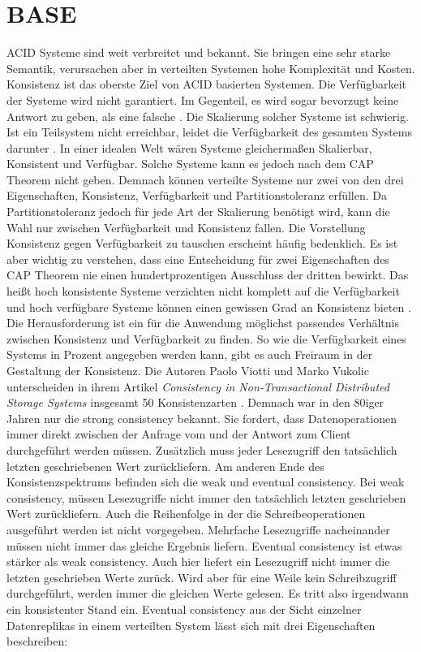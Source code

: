 \documentclass[12pt,oneside,a4paper,parskip]{scrbook}
\begin{document}
\section{BASE}
ACID Systeme sind weit verbreitet und bekannt. Sie bringen eine sehr starke Semantik, verursachen aber in verteilten Systemen hohe Komplexität und Kosten. Konsistenz ist das oberste Ziel von ACID basierten Systemen. Die Verfügbarkeit der Systeme wird nicht garantiert. Im Gegenteil, es wird sogar bevorzugt keine Antwort zu geben, als eine falsche \cite{clusterBASE}. Die Skalierung solcher Systeme ist schwierig. Ist ein Teilsystem nicht erreichbar, leidet die Verfügbarkeit des gesamten Systems darunter \cite{BASE}. In einer idealen Welt wären Systeme gleichermaßen Skalierbar, Konsistent und Verfügbar. Solche Systeme kann es jedoch nach dem CAP Theorem nicht geben. Demnach können verteilte Systeme nur zwei von den drei Eigenschaften, Konsistenz, Verfügbarkeit und Partitionstoleranz erfüllen. Da Partitionstoleranz jedoch für jede Art der Skalierung benötigt wird, kann die Wahl nur zwischen Verfügbarkeit und Konsistenz fallen. Die Vorstellung Konsistenz gegen Verfügbarkeit zu tauschen erscheint häufig bedenklich. Es ist aber wichtig zu verstehen, dass eine Entscheidung für zwei Eigenschaften des CAP Theorem nie einen hundertprozentigen Ausschluss der dritten bewirkt.
Das heißt hoch konsistente Systeme verzichten nicht komplett auf die Verfügbarkeit und hoch verfügbare Systeme können einen gewissen Grad an Konsistenz bieten \cite{cap}. Die Herausforderung ist ein für die Anwendung möglichst passendes Verhältnis zwischen Konsistenz und Verfügbarkeit zu finden. So wie die Verfügbarkeit eines Systems in Prozent angegeben werden kann, gibt es auch Freiraum in der Gestaltung der Konsistenz. Die Autoren Paolo Viotti und Marko Vukolic unterscheiden in ihrem Artikel \textit{Consistency in Non-Transactional Distributed Storage Systems} insgesamt 50 Konsistenzarten \cite{consistency}. Demnach war in den 80iger Jahren nur die strong consistency bekannt. Sie fordert, dass Datenoperationen immer direkt zwischen der Anfrage vom und der Antwort zum Client durchgeführt werden müssen. Zusätzlich muss jeder Lesezugriff den tatsächlich letzten geschriebenen Wert zurückliefern. Am anderen Ende des Konsistenzspektrums befinden sich die weak und eventual consistency. Bei weak consistency, müssen Lesezugriffe nicht immer den tatsächlich letzten geschrieben Wert zurückliefern. Auch die Reihenfolge in der die Schreibeoperationen ausgeführt werden ist nicht vorgegeben. Mehrfache Lesezugriffe nacheinander müssen nicht immer das gleiche Ergebnis liefern. Eventual consistency ist etwas stärker als weak consistency. Auch hier liefert ein Lesezugriff nicht immer die letzten geschrieben Werte zurück. Wird aber für eine Weile kein Schreibzugriff durchgeführt, werden immer die gleichen Werte gelesen. Es tritt also irgendwann ein konsistenter Stand ein. Eventual consistency aus der Sicht einzelner Datenreplikas in einem verteilten System lässt sich mit drei Eigenschaften beschreiben:
\end{document}
